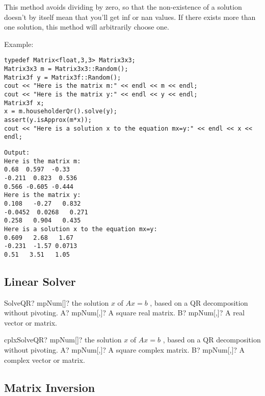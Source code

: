 This method avoids dividing by zero, so that the non-existence of a solution doesn't by itself mean that you'll get inf or nan values.
If there exists more than one solution, this method will arbitrarily choose one.


Example:
\begin{lstlisting}
typedef Matrix<float,3,3> Matrix3x3;
Matrix3x3 m = Matrix3x3::Random();
Matrix3f y = Matrix3f::Random();
cout << "Here is the matrix m:" << endl << m << endl;
cout << "Here is the matrix y:" << endl << y << endl;
Matrix3f x;
x = m.householderQr().solve(y);
assert(y.isApprox(m*x));
cout << "Here is a solution x to the equation mx=y:" << endl << x << endl;
\end{lstlisting}

\begin{verbatim}
Output:
Here is the matrix m:
0.68  0.597  -0.33
-0.211  0.823  0.536
0.566 -0.605 -0.444
Here is the matrix y:
0.108   -0.27   0.832
-0.0452  0.0268   0.271
0.258   0.904   0.435
Here is a solution x to the equation mx=y:
0.609   2.68   1.67
-0.231  -1.57 0.0713
0.51   3.51   1.05
\end{verbatim}




\subsection{Linear Solver}


\begin{mpFunctionsExtract}
	\mpFunctionTwo
	{SolveQR? mpNum[]? the solution $x$ of $A x = b$ , based on a QR decomposition without pivoting.}
	{A? mpNum[,]? A square real matrix.}
	{B? mpNum[,]? A real vector or matrix.}
\end{mpFunctionsExtract}


\vspace{0.6cm}
\begin{mpFunctionsExtract}
	\mpFunctionTwo
	{cplxSolveQR? mpNum[]? the solution $x$ of $A x = b$ , based on a QR decomposition without pivoting.}
	{A? mpNum[,]? A square complex matrix.}
	{B? mpNum[,]? A complex vector or matrix.}
\end{mpFunctionsExtract}





\subsection{Matrix Inversion}


